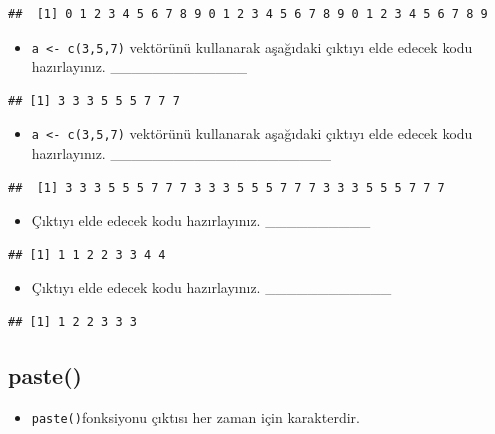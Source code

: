 \documentclass[
  oneside]{book}
\providecommand{\tightlist}{%
  \setlength{\itemsep}{0pt}\setlength{\parskip}{0pt}}
\begin{document}
\begin{verbatim}
##  [1] 0 1 2 3 4 5 6 7 8 9 0 1 2 3 4 5 6 7 8 9 0 1 2 3 4 5 6 7 8 9
\end{verbatim}

\begin{itemize}
\tightlist
\item
  \texttt{a\ \textless{}-\ c(3,5,7)} vektörünü kullanarak aşağıdaki çıktıyı elde edecek kodu hazırlayınız. \_\_\_\_\_\_\_\_\_\_\_\_\_
\end{itemize}

\begin{verbatim}
## [1] 3 3 3 5 5 5 7 7 7
\end{verbatim}

\begin{itemize}
\tightlist
\item
  \texttt{a\ \textless{}-\ c(3,5,7)} vektörünü kullanarak aşağıdaki çıktıyı elde edecek kodu hazırlayınız. \_\_\_\_\_\_\_\_\_\_\_\_\_\_\_\_\_\_\_\_\_
\end{itemize}

\begin{verbatim}
##  [1] 3 3 3 5 5 5 7 7 7 3 3 3 5 5 5 7 7 7 3 3 3 5 5 5 7 7 7
\end{verbatim}

\begin{itemize}
\tightlist
\item
  Çıktıyı elde edecek kodu hazırlayınız. \_\_\_\_\_\_\_\_\_\_
\end{itemize}

\begin{verbatim}
## [1] 1 1 2 2 3 3 4 4
\end{verbatim}

\begin{itemize}
\tightlist
\item
  Çıktıyı elde edecek kodu hazırlayınız. \_\_\_\_\_\_\_\_\_\_\_\_
\end{itemize}

\begin{verbatim}
## [1] 1 2 2 3 3 3
\end{verbatim}

\hypertarget{paste}{%
\subsection{paste()}\label{paste}}

\begin{itemize}
\tightlist
\item
  \texttt{paste()}fonksiyonu çıktısı her zaman için karakterdir.
\end{itemize}
\end{document}
